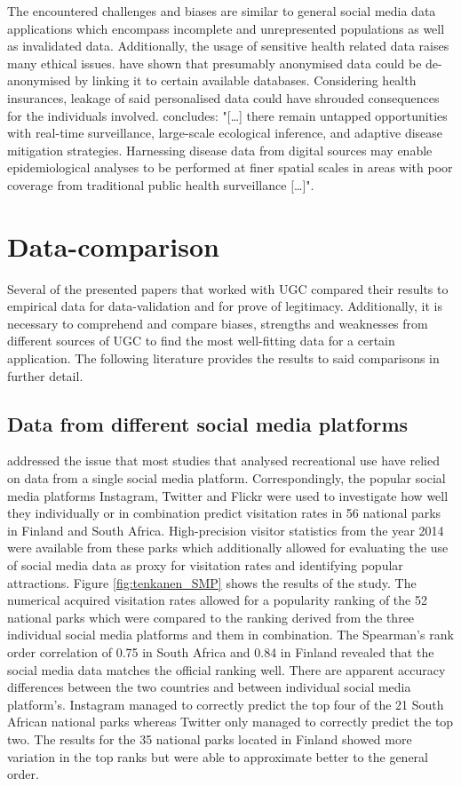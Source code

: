 The encountered challenges and biases are similar to general social media data applications which encompass incomplete and unrepresented populations as well as invalidated data. Additionally, the usage of sensitive health related data raises many ethical issues. \textcite{DeMontjoye2013} have shown that presumably anonymised data could be de-anonymised by linking it to certain available databases. Considering health insurances, leakage of said personalised data could have shrouded consequences for the individuals involved.  
\textcite[p.410]{Lee2016} concludes: "[\dots] there remain untapped opportunities with real-time surveillance, large-scale ecological inference, and adaptive disease mitigation strategies. Harnessing disease data from digital sources may enable epidemiological analyses to be performed at finer spatial scales in areas with poor coverage from traditional public health surveillance [\dots]".

\section{Data-comparison} \label{data_comparison_SotA}
Several of the presented papers that worked with UGC compared their results to empirical data for data-validation and for prove of legitimacy. Additionally, it is necessary to comprehend and compare biases, strengths and weaknesses from different sources of UGC to find the most well-fitting data for a certain application. The following literature provides the results to said comparisons in further detail.

\subsection{Data from different social media platforms} \label{SMP_vs_SMP}

\textcite{Tenkanen2017} addressed the issue that most studies that analysed recreational use have relied on data from a single social media platform. Correspondingly, the popular social media platforms Instagram, Twitter and Flickr were used to investigate how well they individually or in combination predict visitation rates in 56 national parks in Finland and South Africa. High-precision visitor statistics from the year 2014 were available from these parks which additionally allowed for evaluating the use of social media data as proxy for visitation rates and identifying popular attractions. Figure \ref{fig:tenkanen_SMP} shows the results of the study. The numerical acquired visitation rates allowed for a popularity ranking of the 52 national parks which were compared to the ranking derived from the three individual social media platforms and them in combination. The Spearman's rank order correlation of 0.75 in South Africa and 0.84 in Finland revealed that the social media data matches the official ranking well. There are apparent accuracy differences between the two countries and between individual social media platform's. Instagram managed to correctly predict the top four of the 21 South African national parks whereas Twitter only managed to correctly predict the top two. The results for the 35 national parks located in Finland showed more variation in the top ranks but were able to approximate better to the general order.

